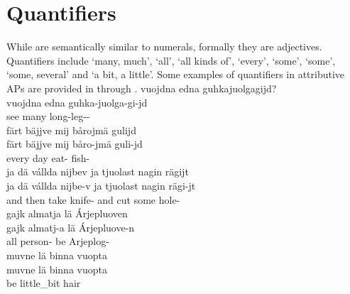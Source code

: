\section{Quantifiers}\label{quantifiers}
While  are semantically similar to numerals, formally they are adjectives. %
Quantifiers include %
 ‘many, much’,  ‘all’,  ‘all kinds of’,  ‘every’,  ‘some’,  ‘some’,  ‘some, several’ and  ‘a bit, a little’. %
Some examples of quantifiers in attributive APs are provided in  %
through .
\ea\label{quantEx1}%
\glll	vuojdna edna guhkajuolgagijd?\\
	vuojdna edna guhka-juolga-gi-jd\\
	see\BS{} many long-leg--\\\nopagebreak
{}	
\z
\ea\label{quantEx2a}%
\glll	färt bäjjve mij bårojmä gulijd\\
	färt bäjjve mij båro-jmä guli-jd\\
	every day\BS{}  eat- fish-\\\nopagebreak
{}	
\z
\ea\label{quantEx2b}%
\glll	ja dä vállda nijbev ja tjuolast nagin rägijt\\
	ja dä vállda nijbe-v ja tjuolast nagin rägi-jt\\
	and then take\BS{} knife- and cut\BS{} some hole-\\\nopagebreak
{}	
\z
\ea\label{quantEx3}%
\glll	gajk almatja lä Árjepluoven\\
	gajk almatj-a lä Árjepluove-n\\
	all person- be\BS{} Arjeplog-\\\nopagebreak
{}	
\z
\ea\label{quantEx4}%
\glll	muvne lä binna vuopta\\
	muvne lä binna vuopta\\
	 be\BS{} little\_bit hair\BS{}\\\nopagebreak
{}	
\z

